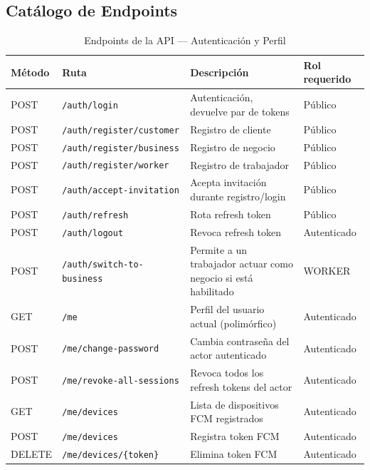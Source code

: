 \documentclass[12pt,a4paper,twoside]{report}
\begin{document}
\subsection{Catálogo de Endpoints}

\begin{table}[htbp]
\centering
\scriptsize
\caption{Endpoints de la API — Autenticación y Perfil}
\label{tab:endpoints-auth}
\begin{tabularx}{\textwidth}{@{}L{0.10\textwidth}L{0.36\textwidth}Y L{0.18\textwidth}@{}}
\toprule
Método & Ruta & Descripción & Rol requerido \\
\midrule
POST & \texttt{/auth/login} & Autenticación, devuelve par de tokens & Público \\
POST & \texttt{/auth/register/customer} & Registro de cliente & Público \\
POST & \texttt{/auth/register/business} & Registro de negocio & Público \\
POST & \texttt{/auth/register/worker} & Registro de trabajador & Público \\
POST & \texttt{/auth/accept-invitation} & Acepta invitación durante registro/login & Público \\
POST & \texttt{/auth/refresh} & Rota refresh token & Público \\
POST & \texttt{/auth/logout} & Revoca refresh token & Autenticado \\
POST & \texttt{/auth/switch-to-business} & Permite a un trabajador actuar como negocio si está habilitado & WORKER \\
GET  & \texttt{/me} & Perfil del usuario actual (polimórfico) & Autenticado \\
POST & \texttt{/me/change-password} & Cambia contraseña del actor autenticado & Autenticado \\
POST & \texttt{/me/revoke-all-sessions} & Revoca todos los refresh tokens del actor & Autenticado \\
GET  & \texttt{/me/devices} & Lista de dispositivos FCM registrados & Autenticado \\
POST & \texttt{/me/devices} & Registra token FCM & Autenticado \\
DELETE & \texttt{/me/devices/\{token\}} & Elimina token FCM & Autenticado \\
\bottomrule
\end{tabularx}
\end{table}
\end{document}
